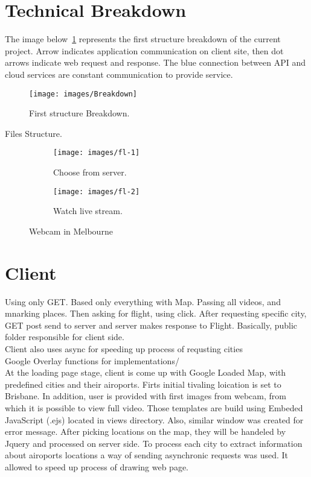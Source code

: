 \documentclass[12pt]{article}
\numberwithin{equation}{section} %
\numberwithin{figure}{section} %
\numberwithin{table}{section} %
\begin{document}
\section{Technical Breakdown}	
	The image below~\ref{fig:break} represents the first structure breakdown of the current project. Arrow indicates application communication on client site, then dot arrows indicate web request and response. The blue connection between API and cloud services are constant communication to provide service.
	\begin{figure}[H]
		\centering		
		\texttt{[image: images/Breakdown]}
		\caption{First structure Breakdown.}
		\label{fig:break}
	\end{figure}
	Files Structure. \\
	\begin{figure}[H]
		\begin{subfigure}[b]{0.25\textwidth}
			\centering
			\texttt{[image: images/fl-1]}
			\caption{Choose from server.}
			
		\end{subfigure}
		\begin{subfigure}[b]{0.25\textwidth}
			\centering
			\texttt{[image: images/fl-2]}
			\caption{Watch live stream.}
			
		\end{subfigure}
		\caption{Webcam in Melbourne}
	\end{figure}
		
\newpage
\section{Client}
	Using only GET. Based only everything with Map. Passing all videos, and mnarking places. Then asking for flight, using click. After requesting specific city, GET post send to server and server makes response to Flight. Basically, public folder responsible for client side. \\
	Client also uses async for speeding up process of requsting cities	\\
	Google Overlay functions for implementations/	 \\
	
	At the loading page stage, client is come up with Google Loaded Map, with predefined cities and their airoports. Firts initial tivaling loication is set to Brisbane. In addition, user is provided with first images from webcam, from which it is possible to view full video. Those templates are build using Embeded JavaScript (.ejs) located in views directory. Also, similar window was created for error message. After picking locations on the map, they will be handeled by Jquery and processed on server side. To process each city to extract information about airoports locations a way of sending asynchronic requests was used. It allowed to speed up process of drawing web page. \\
	
\end{document}
